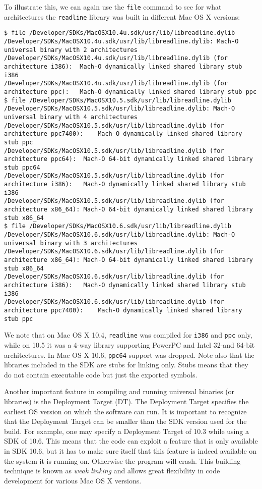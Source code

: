 \documentclass{article}[12pt,a4]
\begin{document}
To illustrate this, we can again use the {\tt file} command to see for what architectures the {\tt readline}
library was built in different Mac OS X versions:
{\scriptsize
\begin{verbatim} 
$ file /Developer/SDKs/MacOSX10.4u.sdk/usr/lib/libreadline.dylib
/Developer/SDKs/MacOSX10.4u.sdk/usr/lib/libreadline.dylib: Mach-O universal binary with 2 architectures
/Developer/SDKs/MacOSX10.4u.sdk/usr/lib/libreadline.dylib (for architecture i386):	Mach-O dynamically linked shared library stub i386
/Developer/SDKs/MacOSX10.4u.sdk/usr/lib/libreadline.dylib (for architecture ppc):	Mach-O dynamically linked shared library stub ppc
$ file /Developer/SDKs/MacOSX10.5.sdk/usr/lib/libreadline.dylib
/Developer/SDKs/MacOSX10.5.sdk/usr/lib/libreadline.dylib: Mach-O universal binary with 4 architectures
/Developer/SDKs/MacOSX10.5.sdk/usr/lib/libreadline.dylib (for architecture ppc7400):	Mach-O dynamically linked shared library stub ppc
/Developer/SDKs/MacOSX10.5.sdk/usr/lib/libreadline.dylib (for architecture ppc64):	Mach-O 64-bit dynamically linked shared library stub ppc64
/Developer/SDKs/MacOSX10.5.sdk/usr/lib/libreadline.dylib (for architecture i386):	Mach-O dynamically linked shared library stub i386
/Developer/SDKs/MacOSX10.5.sdk/usr/lib/libreadline.dylib (for architecture x86_64):	Mach-O 64-bit dynamically linked shared library stub x86_64
$ file /Developer/SDKs/MacOSX10.6.sdk/usr/lib/libreadline.dylib
/Developer/SDKs/MacOSX10.6.sdk/usr/lib/libreadline.dylib: Mach-O universal binary with 3 architectures
/Developer/SDKs/MacOSX10.6.sdk/usr/lib/libreadline.dylib (for architecture x86_64):	Mach-O 64-bit dynamically linked shared library stub x86_64
/Developer/SDKs/MacOSX10.6.sdk/usr/lib/libreadline.dylib (for architecture i386):	Mach-O dynamically linked shared library stub i386
/Developer/SDKs/MacOSX10.6.sdk/usr/lib/libreadline.dylib (for architecture ppc7400):	Mach-O dynamically linked shared library stub ppc
\end{verbatim}}
We note that on Mac OS X 10.4, {\tt readline} was compiled for {\tt i386} and {\tt ppc} only, while on
10.5 it was a 4-way library supporting PowerPC and Intel 32-and 64-bit architectures.
In Mac OS X 10.6, {\tt ppc64} support was dropped.
Note also that the libraries included in the SDK are stubs for linking only.
Stubs means that they do not contain executable code but just the exported symbols. 

Another important feature in compiling and running universal binaries (or libraries) is the 
Deployment Target (DT).
The Deployment Target specifies the earliest OS version on which the software can run.
It is important to recognize that the Deployment Target can be smaller than the SDK version used
for the build.
For example, one may specify a Deployment Target of 10.3 while using a SDK of 10.6.
This means that the code can exploit a feature that is only available in SDK 10.6, but it has 
to make sure itself that this feature is indeed available on the system it is running on.
Otherwise the program will crash.
This building technique is known as {\em weak linking} and allows great flexibility in code
development for various Mac OS X versions.
\end{document}

